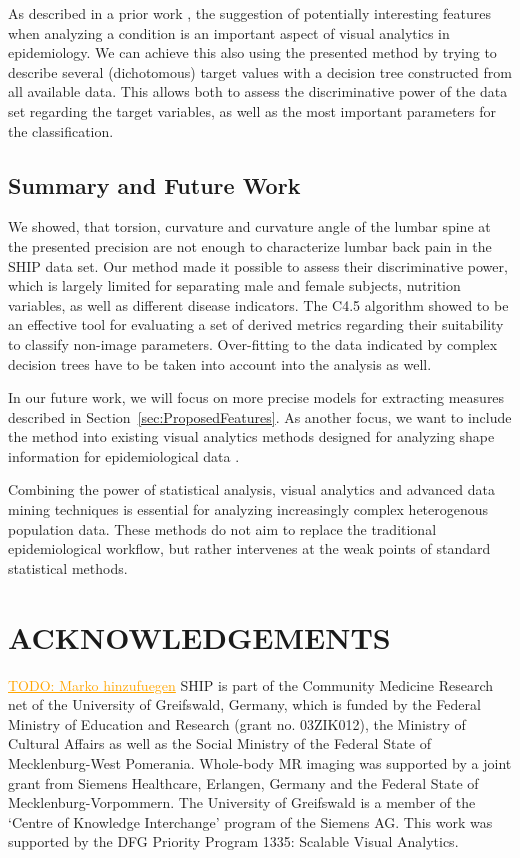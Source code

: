 \documentclass[a4paper,twoside]{style/article}
\newcommand{\com}[1]{\textcolor{orange}{\uline{#1}}}
\begin{document}
As described in a prior work \cite{Klemm2014VIS}, the suggestion of potentially interesting features when analyzing a condition is an important aspect of visual analytics in epidemiology.
We can achieve this also using the presented method by trying to describe several (dichotomous) target values with a decision tree constructed from all available data.
This allows both to assess the discriminative power of the data set regarding the target variables, as well as the most important parameters for the classification.

\subsection{Summary and Future Work}
\noindent We showed, that torsion, curvature and curvature angle of the lumbar spine at the presented precision are not enough to characterize lumbar back pain in the SHIP data set.
Our method made it possible to assess their discriminative power, which is largely limited for separating male and female subjects, nutrition variables, as well as different disease indicators.
The C4.5 algorithm showed to be an effective tool for evaluating a set of derived metrics regarding their suitability to classify non-image parameters.
Over-fitting to the data indicated by complex decision trees have to be taken into account into the analysis as well.

In our future work, we will focus on more precise models for extracting measures described in Section~\ref{sec:ProposedFeatures}.
As another focus, we want to include the method into existing visual analytics methods designed for analyzing shape information for epidemiological data \cite{Klemm2014VIS}.

Combining the power of statistical analysis, visual analytics and advanced data mining techniques is essential for analyzing increasingly complex heterogenous population data.
These methods do not aim to replace the traditional epidemiological workflow, but rather intervenes at the weak points of standard statistical methods.

\section*{\uppercase{Acknowledgements}}

\noindent \com{TODO: Marko hinzufuegen} SHIP is part of the Community Medicine Research net of the University of Greifswald, Germany, which is funded by the Federal Ministry of Education and Research (grant no. 03ZIK012), the Ministry of Cultural Affairs as well as the Social Ministry of the Federal State of Mecklenburg-West Pomerania. Whole-body MR imaging was supported by a joint grant from Siemens Healthcare, Erlangen, Germany and the Federal State of Mecklenburg-Vorpommern. The University of Greifswald is a member of the ‘Centre of Knowledge Interchange’ program of the Siemens AG. This work was supported by the DFG Priority Program 1335: Scalable Visual Analytics.
\end{document}
